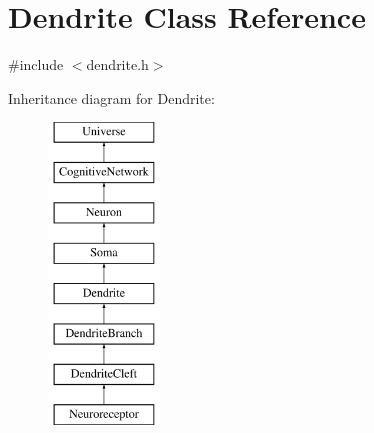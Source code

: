 \hypertarget{classDendrite}{}\section{Dendrite Class Reference}
\label{classDendrite}


{\ttfamily \#include $<$dendrite.\+h$>$}

Inheritance diagram for Dendrite\+:\begin{figure}[H]
\begin{center}
\leavevmode
\includegraphics[height=8.000000cm]{classDendrite}
\end{center}
\end{figure}
